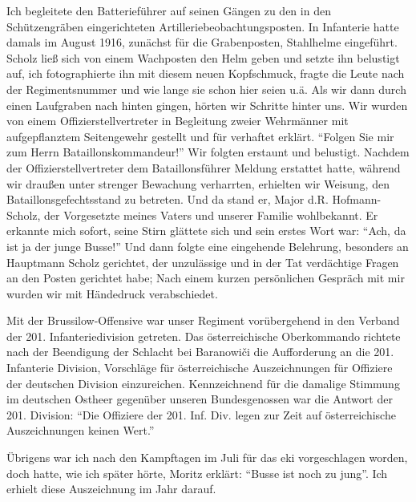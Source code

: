 \documentclass[a5paper,pagesize,10pt,twoside=true]{scrbook}
\renewcommand{\marginpar}[2][]{}
\begin{document}
\marginpar{290}
Ich begleitete den Batterieführer auf seinen Gängen zu den in den Schützengräben eingerichteten Artilleriebeobachtungsposten. In Infanterie hatte damals im August 1916, zunächst für die Grabenposten, Stahlhelme eingeführt. Scholz ließ sich von einem Wachposten den Helm geben und setzte ihn belustigt auf, ich fotographierte ihn mit diesem neuen Kopfschmuck, fragte die Leute nach der Regimentsnummer und wie lange sie schon hier seien u.ä. Als wir dann durch einen Laufgraben nach hinten gingen, hörten wir Schritte hinter uns. Wir wurden von einem Offizierstellvertreter in Begleitung zweier Wehrmänner mit aufgepflanztem Seitengewehr gestellt und für verhaftet erklärt. \enquote{Folgen Sie mir zum Herrn Bataillonskommandeur!} Wir folgten erstaunt und belustigt. Nachdem der Offizierstellvertreter dem Bataillonsführer Meldung erstattet hatte, während wir draußen unter strenger Bewachung verharrten, erhielten wir Weisung, den Bataillonsgefechtsstand zu betreten. Und da stand er, Major d.R. Hofmann-Scholz, der Vorgesetzte meines Vaters und unserer Familie wohlbekannt. Er erkannte mich sofort, seine Stirn glättete sich und sein erstes Wort war: \enquote{Ach, da ist ja der junge Busse!} Und dann folgte eine eingehende Belehrung, besonders an Hauptmann Scholz gerichtet, der unzulässige und in der Tat verdächtige Fragen an den Posten gerichtet habe; Nach einem kurzen persönlichen Gespräch mit mir wurden wir mit Händedruck verabschiedet.

Mit der Brussilow-Offensive war unser Regiment vorübergehend in den Verband der 201. Infanteriedivision getreten. Das österreichische Oberkommando richtete nach der Beendigung der Schlacht bei Baranowiči die Aufforderung an die 201. Infanterie Division, Vorschläge für österreichische Auszeichnungen für Offiziere der deutschen Division einzureichen. Kennzeichnend für die damalige Stimmung im deutschen Ostheer gegenüber unseren Bundesgenossen war die Antwort der 201. Division: \enquote{Die Offiziere der 201. Inf. Div. legen zur Zeit auf österreichische Auszeichnungen keinen Wert.}

\marginpar{292}
Übrigens war ich nach den Kampftagen im Juli für das \ac{eki} vorgeschlagen worden, doch hatte, wie ich später hörte, Moritz erklärt: \enquote{Busse ist noch zu jung}. Ich erhielt diese Auszeichnung im Jahr darauf.
\end{document}
